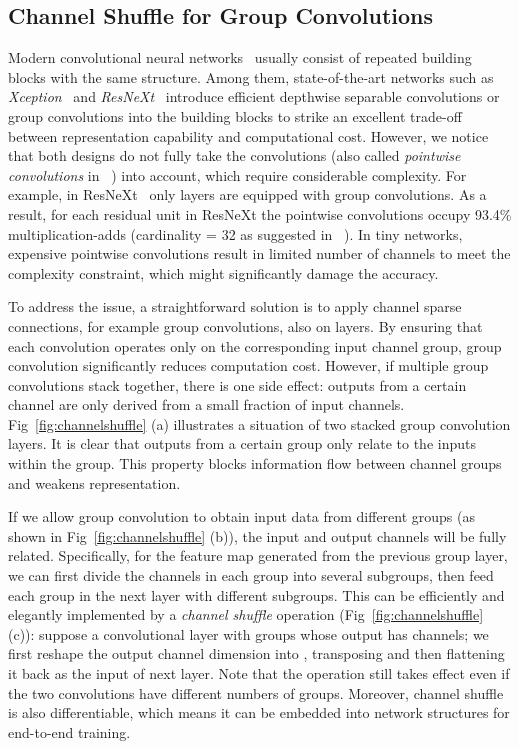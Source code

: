 \documentclass[10pt,twocolumn,letterpaper]{article}
\begin{document}
\subsection{Channel Shuffle for Group Convolutions}
\label{sec:channelshuffle}

Modern convolutional neural networks~\cite{simonyan2014very,szegedy2015going,szegedy2016rethinking,szegedy2016inception,he2016deep,he2016identity} usually consist of repeated building blocks with the same structure. Among them, state-of-the-art networks such as \emph{Xception}~\cite{chollet2016xception} and \emph{ResNeXt}~\cite{xie2016aggregated} introduce efficient depthwise separable convolutions or group convolutions into the building blocks to strike an excellent trade-off between representation capability and computational cost. However, we notice that both designs do not fully take the  convolutions (also called \emph{pointwise convolutions} in ~\cite{howard2017mobilenets}) into account, which require considerable complexity. For example, in ResNeXt~\cite{xie2016aggregated} only  layers are equipped with group convolutions. As a result, for each residual unit in ResNeXt the pointwise convolutions occupy 93.4\% multiplication-adds (cardinality = 32 as suggested in ~\cite{xie2016aggregated}). In tiny networks, expensive pointwise convolutions result in limited number of channels to meet the complexity constraint, which might significantly damage the accuracy.

To address the issue, a straightforward solution is to apply channel sparse connections, for example group convolutions, also on  layers. By ensuring that each convolution operates only on the corresponding input channel group, group convolution significantly reduces computation cost. However, if multiple group convolutions stack together, there is one side effect: outputs from a certain channel are only derived from a small fraction of input channels. Fig~\ref{fig:channelshuffle} (a) illustrates a situation of two stacked group convolution layers. It is clear that outputs from a certain group only relate to the inputs within the group. This property blocks information flow between channel groups and weakens representation.



If we allow group convolution to obtain input data from different groups (as shown in Fig~\ref{fig:channelshuffle} (b)), the input and output channels will be fully related. Specifically, for the feature map generated from the previous group layer, we can first divide the channels in each group into several subgroups, then feed each group in the next layer with different subgroups. This can be efficiently and elegantly implemented by a \emph{channel shuffle} operation (Fig~\ref{fig:channelshuffle} (c)): suppose a convolutional layer with  groups whose output has  channels; we first reshape the output channel dimension into , transposing and then flattening it back as the input of next layer. Note that the operation still takes effect even if the two convolutions have different numbers of groups. Moreover, channel shuffle is also differentiable, which means it can be embedded into network structures for end-to-end training.
\end{document}
